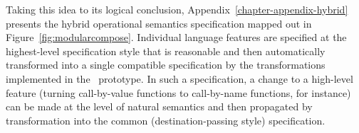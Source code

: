 Taking this idea to its logical conclusion,
Appendix~\ref{chapter-appendix-hybrid} presents the hybrid operational
semantics specification mapped out in
Figure~\ref{fig:modularcompose}. Individual language features are
specified at the highest-level specification style that is reasonable
and then automatically transformed into a single compatible
specification by the transformations implemented in the
\sls~prototype. In such a specification, a change to a high-level
feature (turning call-by-value functions to call-by-name functions,
for instance) can be made at the level of natural semantics and
then propagated by transformation into the common (destination-passing
style) specification.



